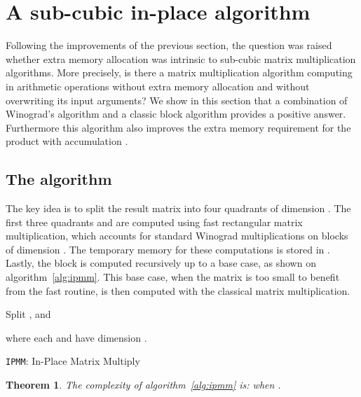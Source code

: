 \documentclass{article}
\newtheorem{thm}{Theorem}
\begin{document}
\section{A sub-cubic in-place algorithm}\label{sec:mix}
Following the improvements of the previous section, the question was raised
whether extra memory allocation was intrinsic to sub-cubic matrix multiplication
algorithms. More precisely, is there a matrix multiplication algorithm computing
 in
 arithmetic operations without extra memory allocation and without
overwriting its input arguments? We show in this section that a combination of Winograd's algorithm and a classic block algorithm provides a positive answer.
Furthermore this algorithm also improves the extra memory requirement for the
product with accumulation .
\subsection{The algorithm}\label{sec:fully}
The key idea is to split the result matrix  into four quadrants of dimension
. The first
three quadrants  and  are computed using fast
rectangular matrix multiplication, which accounts for  standard
Winograd multiplications on blocks of dimension . The temporary
memory for these computations is stored in . Lastly, the block 
is  computed recursively up to a base case,
as shown on algorithm~\ref{alg:ipmm}. This base case, when the matrix
is too small to benefit from the fast routine, is then computed
with the classical matrix multiplication.
\begin{algorithm}[htb]
	\begin{algorithmic}[1]
\Ensure{}
\State Split ,  and
			\Comment \begin{minipage}{3cm}
			where each  and  have dimension .
		\end{minipage}
		\Do {}
		\State 
		\State 
		\State 
		\EndDo
		\For {} 
		\State 
		\State 
		\State  
		\EndFor
		\State  {}
\end{algorithmic}
	\caption{\texttt{IPMM}: In-Place Matrix Multiply}\label{alg:ipmm}
\end{algorithm}
\begin{thm}
The complexity of algorithm~\ref{alg:ipmm} is:
 when .\end{thm}
\end{document}
